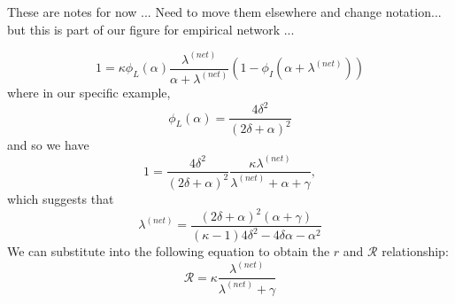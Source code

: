 \documentclass[12pt]{article}
\newcommand{\RR}{\ensuremath{{\mathcal R}}}
\begin{document}
These are notes for now ... Need to move them elsewhere and change notation... but this is part of our figure for empirical network ...

$$
1 = \kappa \phi_L(\alpha) \frac{\lambda^{(net)}}{\alpha + \lambda^{(net)}} (1 - \phi_I(\alpha+\lambda^{(net)}))
$$
where in our specific example,
$$
\phi_L(\alpha) = \frac{4 \delta^2}{(2 \delta + \alpha)^2}
$$
and so we have
$$
1 = \frac{4 \delta^2}{(2 \delta + \alpha)^2} \frac{\kappa \lambda^{(net)}}{\lambda^{(net)} + \alpha + \gamma},
$$
which suggests that
$$
\lambda^{(net)} = \frac{(2\delta + \alpha)^2 (\alpha + \gamma)}{(\kappa - 1) 4 \delta^2 - 4 \delta \alpha - \alpha^2}
$$
We can substitute into the following equation to obtain the $r$ and $\RR$ relationship:
$$
\RR = \kappa \frac{\lambda^{(net)}}{\lambda^{(net)} + \gamma}
$$


\end{document}
